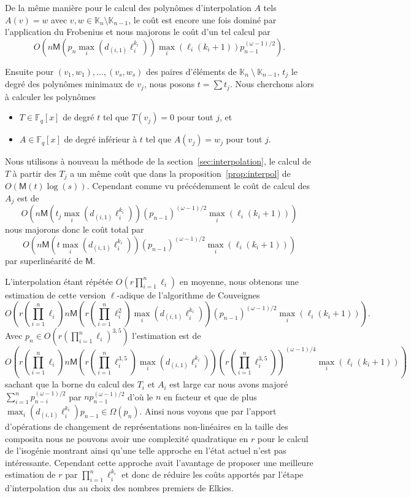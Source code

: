 \documentclass[10pt,a4paper]{book}
\theoremstyle{plain}
\theoremstyle{definition}
\theoremstyle{definition}
\theoremstyle{definition}
\theoremstyle{definition}
\theoremstyle{definition}
\theoremstyle{remark}
\theoremstyle{remark}
\theoremstyle{definition}
\begin{document}
De la même manière pour le calcul des polynômes d'interpolation $A$ tels 
$A(v)=w$ avec $v,w \in \mathbb{K}_n \setminus \mathbb{K}_{n-1}$, le coût est
encore une fois dominé par l'application du Frobenius et nous majorons le coût 
d'un tel calcul par \[O(n\mathsf{M}(p_n \max_i(d_{(i,1)}\ell_i^{k_i}))
\max_i(\ell_i(k_i+1))p_{n-1}^{(\omega-1)/2}).\]

Ensuite pour $(v_1,w_1),\dots,(v_s,w_s)$ des paires d'éléments de 
$\mathbb{K}_n~\setminus~\mathbb{K}_{n-1}$, $t_j$ le degré des polynômes 
minimaux de $v_j$, nous posons $t=\sum t_j$. 
Nous cherchons alors à calculer les polynômes
  \begin{itemize}
  \item $T\in \mathbb{F}_q[x]$ de degré $t$ tel que $T(v_j)=0$ pour tout $j$,
    et
  \item $A\in \mathbb{F}_q[x]$ de degré inférieur à $t$ tel que $A(v_j)=w_j$ pour
    tout $j$.
  \end{itemize}
Nous utilisons à nouveau la méthode de la section~\ref{sec:interpolation}, le 
calcul de $T$ à partir des $T_j$ a un même coût que dans la 
proposition~\ref{prop:interpol} de $O(\mathsf{M}(t)\log(s))$. 
Cependant comme vu précédemment le coût de calcul des $A_j$ est de 
\[
O(n\mathsf{M}(t_j\max_i(d_{(i,1)}\ell_i^{k_i}))(p_{n-1})^{(\omega-1)/2}
\max_i(\ell_i(k_i+1)))
\]
nous majorons donc le coût total par
\[O(n\mathsf{M}(t\max_i(d_{(i,1)}
\ell_i^{k_i}))(p_{n-1})^{(\omega-1)/2}\max_i(\ell_i(k_i+1)))\]
par superlinéarité de 
$\mathsf{M}$.

L'interpolation étant répétée $O(r \prod_{i=1}^n\ell_i)$ en moyenne, nous 
obtenons une estimation de cette version $\ell$-adique de l'algorithme de 
Couveignes
\[ O(r (\prod_{i=1}^n\ell_i)n\mathsf{M}(r (\prod_{i=1}^n \ell_i^2)
\max_i(d_{(i,1)}\ell_i^{k_i}))(p_{n-1})^{(\omega-1)/2}\max_i(\ell_i (k_i +1)) ).\] 
Avec $p_n \in O(r(\prod_{i=1}^n\ell_i)^{3,5})$ l'estimation est de 
\[ 
O(r(\prod_{i=1}^n\ell_i)n\mathsf{M}(r (\prod_{i=1}^n \ell_i^{3,5})
\max_i(d_{(i,1)}\ell_i^{k_i}))(r (\prod_{i=1}^n \ell_i^{3,5}))^{(\omega-1)/4}
\max_i(\ell_i(k_i+1)) )
\]
sachant que la borne du calcul des $T_i$ et $A_i$ est large car nous avons 
majoré $\sum_{i=1}^np_{n-i}^{(\omega-1)/2}$ par $np_{n-1}^{(\omega-1)/2}$ d'où 
le $n$ en facteur et que de plus 
$\max_i(d_{(i,1)}\ell_i^{k_i})p_{n-1} \in \Omega(p_n)$. Ainsi nous voyons que par 
l'apport d'opérations de changement de représentations non-linéaires en la 
taille des composita nous ne pouvons avoir une complexité quadratique en $r$
pour le calcul de l'isogénie montrant ainsi qu'une telle approche en l'état 
actuel n'est pas intéressante. Cependant cette approche avait l'avantage de 
proposer une meilleure estimation de $r$ par $\prod_{i=1}^n \ell_i^{k_i}$ et 
donc de réduire les coûts apportés par l'étape d'interpolation dus au choix des
nombres premiers de Elkies.
\end{document}
